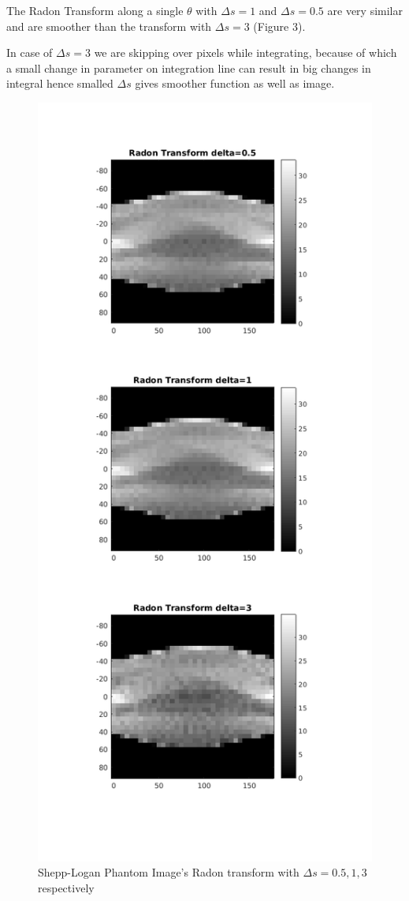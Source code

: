\documentclass[11pt]{article}
\begin{document}
The Radon Transform along a single $\theta$ with $\Delta s=1$ and $\Delta s=0.5$ are very similar and are smoother than the transform with $\Delta s=3$ (Figure 3).

In case of $\Delta s=3$ we are skipping over pixels while integrating, because of which a small change in parameter on integration line can result in big changes in integral hence smalled $\Delta s$ gives smoother function as well as image.

\begin{figure}[h]
\centering
\includegraphics[scale=0.45]{c}
\caption{Shepp-Logan Phantom Image's Radon transform with $\Delta s = 0.5,1,3$ respectively}
\end{figure}
\end{document}

